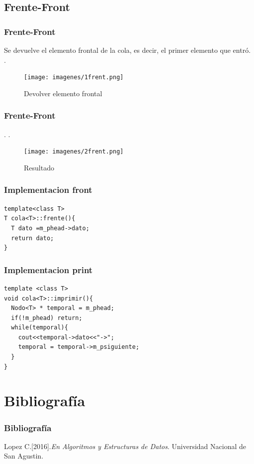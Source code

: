 \documentclass{beamer}
\begin{document}
\subsection{Frente-Front}
    \begin{frame}
      \frametitle{Frente-Front}
      Se devuelve el elemento frontal de la cola, es decir, el primer elemento que entró.\\ 
      .\\
      
      \begin{figure}
	\texttt{[image: imagenes/1frent.png]}
     \caption{Devolver elemento frontal}
     \end{figure}
      
    \end{frame}
    \begin{frame}
      \frametitle{Frente-Front}
.
      .\\
      \begin{figure}
	\texttt{[image: imagenes/2frent.png]}
    \caption{Resultado}
    \end{figure}
    
    \end{frame}




\begin{frame}[fragile]
\frametitle{Implementacion front}
\begin{verbatim}
template<class T>
T cola<T>::frente(){
  T dato =m_phead->dato;
  return dato;
}

\end{verbatim}
\end{frame}


\begin{frame}[fragile]
\frametitle{Implementacion print}
\begin{verbatim}
template <class T>
void cola<T>::imprimir(){
  Nodo<T> * temporal = m_phead;
  if(!m_phead) return;
  while(temporal){
    cout<<temporal->dato<<"->";
    temporal = temporal->m_psiguiente;
  }
}
\end{verbatim}
\end{frame}



\section{Bibliografía}
\begin{frame}
\frametitle{Bibliografía}
\begin{thebibliography}{99}

 Lopez C.[2016].\emph{En Algoritmos y Estructuras de Datos}. Universidad Nacional de San Agustin.

\end{thebibliography}
\end{frame}
\end{document}
